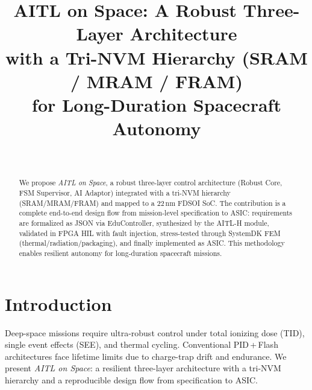 \documentclass[conference]{IEEEtran}
\begin{document}
\title{AITL on Space: A Robust Three-Layer Architecture\\
with a Tri-NVM Hierarchy (SRAM / MRAM / FRAM)\\
for Long-Duration Spacecraft Autonomy}

\author{\\
}

\maketitle

\begin{abstract}
\noindent
We propose \textit{AITL on Space}, a robust three-layer control architecture (Robust Core, FSM Supervisor, AI Adaptor) integrated with a tri-NVM hierarchy (SRAM/MRAM/FRAM) and mapped to a 22\,nm FDSOI SoC. The contribution is a complete end-to-end design flow from mission-level specification to ASIC: requirements are formalized as JSON via EduController, synthesized by the AITL-H module, validated in FPGA HIL with fault injection, stress-tested through SystemDK FEM (thermal/radiation/packaging), and finally implemented as ASIC. This methodology enables resilient autonomy for long-duration spacecraft missions.
\end{abstract}

\section{Introduction}
Deep-space missions require ultra-robust control under total ionizing dose (TID), single event effects (SEE), and thermal cycling. Conventional PID\,+\,Flash architectures face lifetime limits due to charge-trap drift and endurance. We present \emph{AITL on Space}: a resilient three-layer architecture with a tri-NVM hierarchy and a reproducible design flow from specification to ASIC.
\end{document}
